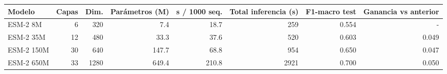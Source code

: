 \begin{tabular}{lrrrrrrr}
\toprule
Modelo & Capas & Dim. & Parámetros (M) & s / 1000 seq. & Total inferencia (s) & F1-macro test & Ganancia vs anterior \\
\midrule
ESM-2 8M & 6 & 320 & 7.4 & 18.7 & 259 & 0.554 & - \\
ESM-2 35M & 12 & 480 & 33.3 & 37.6 & 520 & 0.603 & 0.049 \\
ESM-2 150M & 30 & 640 & 147.7 & 68.8 & 954 & 0.650 & 0.047 \\
ESM-2 650M & 33 & 1280 & 649.4 & 210.8 & 2921 & 0.700 & 0.050 \\
\bottomrule
\end{tabular}
